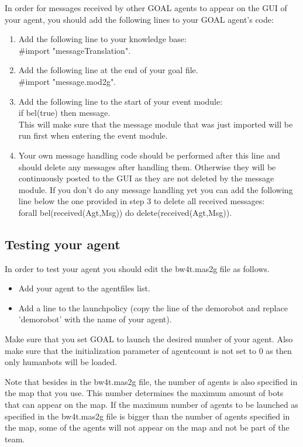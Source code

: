 \documentclass[11pt,a4paper]{article}
\begin{document}
In order for messages received by other GOAL agents to appear on the GUI of your agent, you should add the following lines to your GOAL agent’s code:
\begin{enumerate}
\item Add the following line to your knowledge base:\\
\#import "messageTranslation".
\item Add the following line at the end of your goal file. \\
\#import "message.mod2g".
\item Add the following line to the start of your event module: \\
if bel(true) then message. \\
This will make sure that the message module that was just imported will be run first when entering the event module.
\item Your own message handling code should be performed after this line and should delete any messages after handling them. Otherwise they will be continuously posted to the GUI as they are not deleted by the message module. If you don’t do any message handling yet you can add the following line below the one provided in step 3 to delete all received messages: \\
forall bel(received(Agt,Msg)) do delete(received(Agt,Msg)).
\end{enumerate}

\subsection{Testing your agent}
In order to test your agent you should edit the bw4t.mas2g file as follows.
\begin{itemize}
\item Add your agent to the agentfiles list.
\item Add a line to the launchpolicy (copy the line of the demorobot and replace 'demorobot' with the name of your agent).
\end{itemize}
Make sure that you set GOAL to launch the desired number of your agent. Also make sure that the initialization parameter of agentcount is not set to 0 as then only humanbots will be loaded.

Note that besides in the bw4t.mas2g file, the number of agents is also specified in the map that you use. This number determines the maximum amount of bots that can appear on the map. If the maximum number of agents to be launched as specified in the bw4t.mas2g file is bigger than the number of agents specified in the map, some of the agents will not appear on the map and not be part of the team. 
\end{document}
